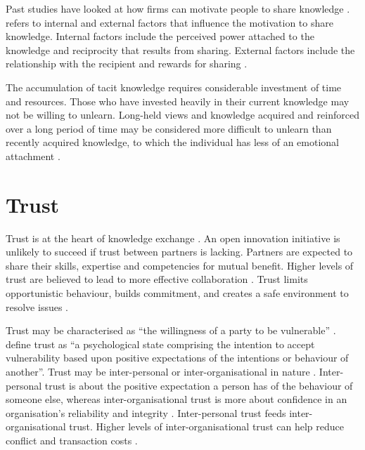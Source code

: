 Past studies have looked at how firms can motivate people to share knowledge \citep[e.g.][]{cabrera2002knowledge,ipe2003knowledge,cabrera2006determinants,wang2010knowledge,witherspoon2013antecedents,von2015s}. \citet{ipe2003knowledge} refers to internal and external factors that influence the motivation to share knowledge. Internal factors include the perceived power attached to the knowledge and reciprocity that results from sharing. External factors include the relationship with the recipient and rewards for sharing \citep{ipe2003knowledge}. \medskip

The accumulation of tacit knowledge requires considerable investment of time and resources. Those who have invested heavily in their current knowledge may not be willing to unlearn. Long-held views and knowledge acquired and reinforced over a long period of time may be considered more difficult to unlearn than recently acquired knowledge, to which the individual has less of an emotional attachment \citep{rebernik2007fostering}. \medskip

\section{Trust}

Trust is at the heart of knowledge exchange \citep{davenport1998working}. An open innovation initiative is unlikely to succeed if trust between partners is lacking. Partners are expected to share their skills, expertise and competencies for mutual benefit. Higher levels of trust are believed to lead to more effective collaboration \citep{axelrod1984evolution}. Trust limits opportunistic behaviour, builds commitment, and creates a safe environment to resolve issues \citep{panteli2005trust}. \medskip

Trust may be characterised as \enquote{the willingness of a party to be vulnerable} \citep{mayer1995integrative}. \citet{rousseau1998not} define trust as \enquote{a psychological state comprising the intention to accept vulnerability based upon positive expectations of the intentions or behaviour of another}. Trust may be inter-personal or inter-organisational in nature \citep{zaheer1998does}. Inter-personal trust is about the positive expectation a person has of the behaviour of someone else, whereas inter-organisational trust is more about confidence in an organisation's reliability and integrity \citep{ashnai2016inter}. Inter-personal trust feeds inter-organisational trust. Higher levels of inter-organisational trust can help reduce conflict and transaction costs \citep{zaheer1998does}. \medskip 

